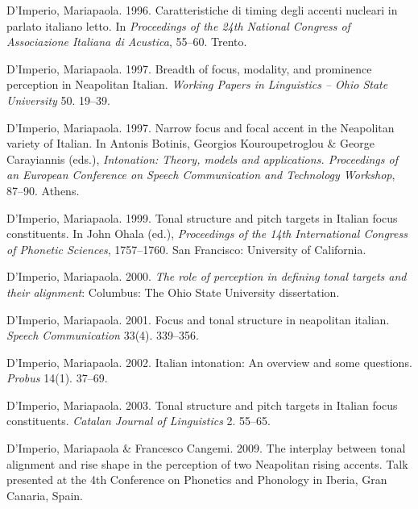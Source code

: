 \documentclass[ number=1
,series=labphon
,output=long
,url=http://langsci-press.org/catalog/book/16
,isbn=978-3-944675-01-5
]{LSP/langsci}
\begin{document}
\begin{thebibliography}{284}
D'Imperio, Mariapaola. 1996.
\newblock Caratteristiche di timing degli accenti nucleari in parlato italiano
  letto.
\newblock In \emph{Proceedings of the 24th {National Congress of Associazione
  Italiana di Acustica}}, 55--60. Trento.

D'Imperio, Mariapaola. 1997{}.
\newblock Breadth of focus, modality, and prominence perception in {N}eapolitan
  {I}talian.
\newblock \emph{Working Papers in Linguistics -- Ohio State University} 50.
  19--39.

D'Imperio, Mariapaola. 1997{}.
\newblock Narrow focus and focal accent in the {N}eapolitan variety of
  {I}talian.
\newblock In Antonis Botinis, Georgios Kouroupetroglou \& George Carayiannis
  (eds.), \emph{Intonation: {T}heory, models and applications. {Proceedings of
  an European Conference on Speech Communication and Technology Workshop}},
  87--90. Athens.

D'Imperio, Mariapaola. 1999.
\newblock Tonal structure and pitch targets in {I}talian focus constituents.
\newblock In John Ohala (ed.), \emph{Proceedings of the 14th {I}nternational
  {C}ongress of {P}honetic {S}ciences}, 1757--1760. San Francisco: University
  of California.

D'Imperio, Mariapaola. 2000.
\newblock \emph{The role of perception in defining tonal targets and their
  alignment}: Columbus: The Ohio State University dissertation.

D'Imperio, Mariapaola. 2001.
\newblock Focus and tonal structure in neapolitan italian.
\newblock \emph{Speech Communication} 33(4). 339--356.

D'Imperio, Mariapaola. 2002.
\newblock Italian intonation: {A}n overview and some questions.
\newblock \emph{Probus} 14(1). 37--69.

D'Imperio, Mariapaola. 2003.
\newblock Tonal structure and pitch targets in {I}talian focus constituents.
\newblock \emph{Catalan Journal of Linguistics} 2. 55--65.


D'Imperio, Mariapaola \& Francesco Cangemi. 2009.
\newblock The interplay between tonal alignment and rise shape in the
  perception of two {N}eapolitan rising accents.
\newblock Talk presented at the 4th Conference on Phonetics and Phonology in
  Iberia, Gran Canaria, Spain.


\end{thebibliography}
\end{document}
